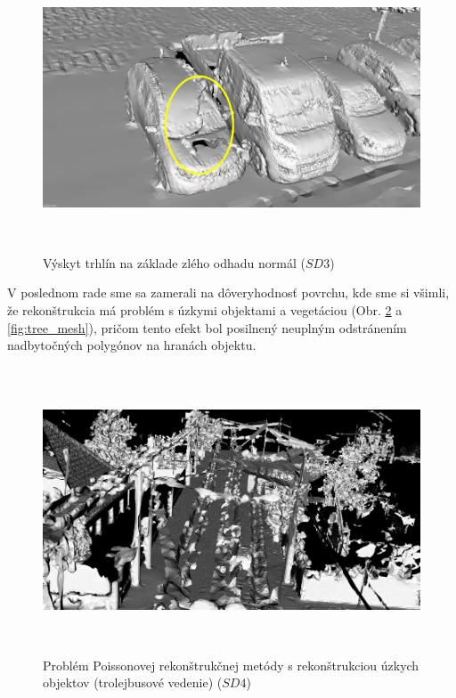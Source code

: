 \begin{figure}[!htbp]
  \centering
  \includegraphics[width=16cm, height=8.5cm]{img/normal_mesh.png}
  \caption{Výskyt trhlín na základe zlého odhadu normál ($SD3$)} 
  \label{fig:normal_mesh}
\end{figure} 

\indent V poslednom rade sme sa zamerali na dôveryhodnosť povrchu, kde sme si všimli, že rekonštrukcia má problém s úzkymi objektami a vegetáciou (Obr. \ref{fig:cable_mesh} a \ref{fig:tree_mesh}), pričom tento efekt bol posilnený neuplným odstránením nadbytočných polygónov na hranách objektu.

\vfill
\begin{figure}[!htbp]
  \centering
  \includegraphics[width=16cm, height=8.5cm]{img/cable_mesh.png}
  \caption{Problém Poissonovej rekonštrukčnej metódy s rekonštrukciou úzkych objektov (trolejbusové vedenie) ($SD4$)} 
  \label{fig:cable_mesh}
\end{figure} 

